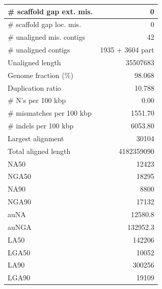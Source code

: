 \documentclass[12pt,a4paper]{article}
\begin{document}
\begin{table}[ht]
\begin{center}
\begin{tabular}{|l*{1}{|r}|}
\# scaffold gap ext. mis. & 0 \\ \hline
\# scaffold gap loc. mis. & 0 \\ \hline
\# unaligned mis. contigs & 42 \\ \hline
\# unaligned contigs & 1935 + 3604 part \\ \hline
Unaligned length & 35507683 \\ \hline
Genome fraction (\%) & 98.068 \\ \hline
Duplication ratio & 10.788 \\ \hline
\# N's per 100 kbp & 0.00 \\ \hline
\# mismatches per 100 kbp & 1551.70 \\ \hline
\# indels per 100 kbp & 6053.80 \\ \hline
Largest alignment & 30104 \\ \hline
Total aligned length & 4182359090 \\ \hline
NA50 & 12423 \\ \hline
NGA50 & 18295 \\ \hline
NA90 & 8800 \\ \hline
NGA90 & 17132 \\ \hline
auNA & 12580.8 \\ \hline
auNGA & 132952.3 \\ \hline
LA50 & 142206 \\ \hline
LGA50 & 10052 \\ \hline
LA90 & 300256 \\ \hline
LGA90 & 19109 \\ \hline
\end{tabular}
\end{center}
\end{table}
\end{document}
